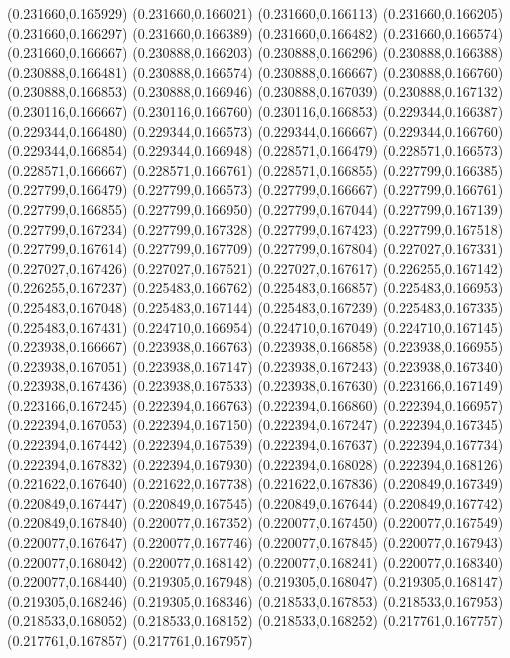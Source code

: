 (0.231660,0.165929)
(0.231660,0.166021)
(0.231660,0.166113)
(0.231660,0.166205)
(0.231660,0.166297)
(0.231660,0.166389)
(0.231660,0.166482)
(0.231660,0.166574)
(0.231660,0.166667)
(0.230888,0.166203)
(0.230888,0.166296)
(0.230888,0.166388)
(0.230888,0.166481)
(0.230888,0.166574)
(0.230888,0.166667)
(0.230888,0.166760)
(0.230888,0.166853)
(0.230888,0.166946)
(0.230888,0.167039)
(0.230888,0.167132)
(0.230116,0.166667)
(0.230116,0.166760)
(0.230116,0.166853)
(0.229344,0.166387)
(0.229344,0.166480)
(0.229344,0.166573)
(0.229344,0.166667)
(0.229344,0.166760)
(0.229344,0.166854)
(0.229344,0.166948)
(0.228571,0.166479)
(0.228571,0.166573)
(0.228571,0.166667)
(0.228571,0.166761)
(0.228571,0.166855)
(0.227799,0.166385)
(0.227799,0.166479)
(0.227799,0.166573)
(0.227799,0.166667)
(0.227799,0.166761)
(0.227799,0.166855)
(0.227799,0.166950)
(0.227799,0.167044)
(0.227799,0.167139)
(0.227799,0.167234)
(0.227799,0.167328)
(0.227799,0.167423)
(0.227799,0.167518)
(0.227799,0.167614)
(0.227799,0.167709)
(0.227799,0.167804)
(0.227027,0.167331)
(0.227027,0.167426)
(0.227027,0.167521)
(0.227027,0.167617)
(0.226255,0.167142)
(0.226255,0.167237)
(0.225483,0.166762)
(0.225483,0.166857)
(0.225483,0.166953)
(0.225483,0.167048)
(0.225483,0.167144)
(0.225483,0.167239)
(0.225483,0.167335)
(0.225483,0.167431)
(0.224710,0.166954)
(0.224710,0.167049)
(0.224710,0.167145)
(0.223938,0.166667)
(0.223938,0.166763)
(0.223938,0.166858)
(0.223938,0.166955)
(0.223938,0.167051)
(0.223938,0.167147)
(0.223938,0.167243)
(0.223938,0.167340)
(0.223938,0.167436)
(0.223938,0.167533)
(0.223938,0.167630)
(0.223166,0.167149)
(0.223166,0.167245)
(0.222394,0.166763)
(0.222394,0.166860)
(0.222394,0.166957)
(0.222394,0.167053)
(0.222394,0.167150)
(0.222394,0.167247)
(0.222394,0.167345)
(0.222394,0.167442)
(0.222394,0.167539)
(0.222394,0.167637)
(0.222394,0.167734)
(0.222394,0.167832)
(0.222394,0.167930)
(0.222394,0.168028)
(0.222394,0.168126)
(0.221622,0.167640)
(0.221622,0.167738)
(0.221622,0.167836)
(0.220849,0.167349)
(0.220849,0.167447)
(0.220849,0.167545)
(0.220849,0.167644)
(0.220849,0.167742)
(0.220849,0.167840)
(0.220077,0.167352)
(0.220077,0.167450)
(0.220077,0.167549)
(0.220077,0.167647)
(0.220077,0.167746)
(0.220077,0.167845)
(0.220077,0.167943)
(0.220077,0.168042)
(0.220077,0.168142)
(0.220077,0.168241)
(0.220077,0.168340)
(0.220077,0.168440)
(0.219305,0.167948)
(0.219305,0.168047)
(0.219305,0.168147)
(0.219305,0.168246)
(0.219305,0.168346)
(0.218533,0.167853)
(0.218533,0.167953)
(0.218533,0.168052)
(0.218533,0.168152)
(0.218533,0.168252)
(0.217761,0.167757)
(0.217761,0.167857)
(0.217761,0.167957)
